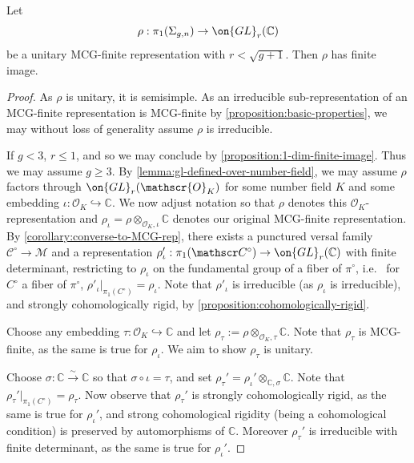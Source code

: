 \begin{proposition}
\notready\label{proposition:unitary-implies-finite}
Let  $$\rho:\pi_1(\Sigma_{g,n})\to
\on{GL}_r(\mathbb{C})$$ be a unitary MCG-finite representation with $r<\sqrt{g+1}$. Then $\rho$ has finite image.
\end{proposition}
\begin{proof}
As $\rho$ is unitary, it is semisimple. As an irreducible sub-representation of an MCG-finite representation is MCG-finite by \autoref{proposition:basic-properties}, we may without loss of generality assume $\rho$ is irreducible.

If $g< 3$, $r\leq 1$, and so we may conclude by \autoref{proposition:1-dim-finite-image}. Thus we may assume $g\geq 3$. By \autoref{lemma:gl-defined-over-number-field}, we may assume $\rho$ factors through $\on{GL}_r(\mathscr{O}_K)$ for some number field $K$ and some embedding $\iota: \mathscr{O}_K\hookrightarrow \mathbb{C}$.
We now adjust notation so that $\rho$ denotes this $\mathscr O_K$-representation and $\rho_\iota=\rho\otimes_{\mathscr{O}_K, \iota}\mathbb{C}$
denotes our original MCG-finite representation. By \autoref{corollary:converse-to-MCG-rep}, there exists a punctured versal family $\mathscr C^\circ \to \mathscr M$
and a representation $\rho'_\iota: \pi_1(\mathscr C^\circ) \to
\on{GL}_r(\mathbb{C})$ with finite determinant, restricting to $\rho_\iota$ on
the fundamental group of a fiber of $\pi^\circ$, i.e.~ for $C^\circ$ a fiber of
$\pi^\circ$, $\rho'_\iota|_{\pi_1(
C^\circ)}=\rho_\iota$. Note that $\rho'_\iota$ is irreducible (as $\rho_\iota$
is irreducible), and strongly cohomologically rigid, by \autoref{proposition:cohomologically-rigid}.

Choose any embedding $\tau: \mathscr O_K \hookrightarrow \mathbb C$ and let
$\rho_\tau := \rho\otimes_{\mathscr{O}_K, \tau}\mathbb{C}$. Note that $\rho_\tau$ is MCG-finite, as the same is true for $\rho_\iota$.
We aim to show $\rho_\tau$ is unitary.

Choose $\sigma: \mathbb{C}\overset{\sim}{\to} \mathbb{C}$ so that $\sigma\circ\iota=\tau$, and set $\rho_\tau'=\rho_{\iota}'\otimes_{\mathbb{C}, \sigma} \mathbb{C}$. Note that $\rho_\tau'|_{\pi_1(
C^\circ)}=\rho_\tau$.
Now observe that $\rho_\tau'$ is strongly cohomologically rigid, as the same is true for $\rho_\iota'$, and strong cohomological rigidity (being a cohomological condition) is preserved by automorphisms of $\mathbb{C}$. Moreover $\rho_\tau'$ is irreducible with finite determinant, as the same is true for $\rho_\iota'$.


\end{proof}
